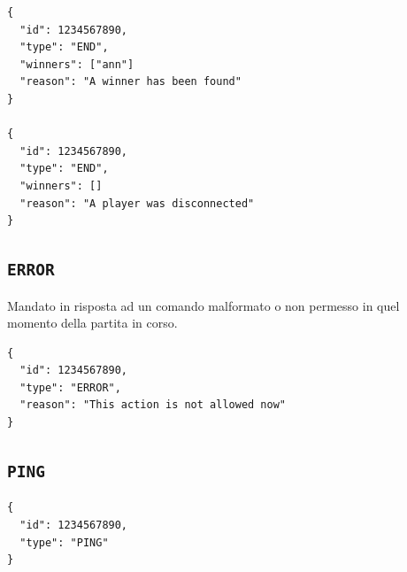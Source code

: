 \documentclass[a4paper,12pt]{article}
\begin{document}
\begin{verbatim}
{
  "id": 1234567890,
  "type": "END",
  "winners": ["ann"]
  "reason": "A winner has been found"
}

{
  "id": 1234567890,
  "type": "END",
  "winners": []
  "reason": "A player was disconnected"
}
\end{verbatim}

\subsection{\texttt{ERROR}}

Mandato in risposta ad un comando malformato o non permesso in quel momento
della partita in corso.

\begin{verbatim}
{
  "id": 1234567890,
  "type": "ERROR",
  "reason": "This action is not allowed now"
}
\end{verbatim}

\subsection{\texttt{PING}}

\begin{verbatim}
{
  "id": 1234567890,
  "type": "PING"
}
\end{verbatim}
\end{document}
